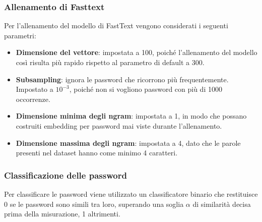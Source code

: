 \subsubsection{Allenamento di Fasttext}
Per l'allenamento del modello di FastText vengono considerati i seguenti parametri:

\begin{itemize}
    \item \textbf{Dimensione del vettore}: impostata a 100, poiché l'allenamento del modello così risulta più rapido rispetto al parametro di default a 300. 
    \item \textbf{Subsampling}: ignora le password che ricorrono più frequentemente. Impostato a $10^{-3}$, poiché non si vogliono password con più di 1000 occorrenze.
    \item \textbf{Dimensione minima degli ngram}: impostata a 1, in modo che possano costruiti embedding per password mai viste durante l'allenamento.
    \item \textbf{Dimensione massima degli ngram}: impostata a 4, dato che le parole presenti nel dataset hanno come minimo 4 caratteri.
\end{itemize}
\subsubsection{Classificazione delle password}
Per classificare le password viene utilizzato un classificatore binario che restituisce 0 se le password sono simili tra loro, superando una soglia $\alpha$ di similarità decisa prima della misurazione, 1 altrimenti. 

